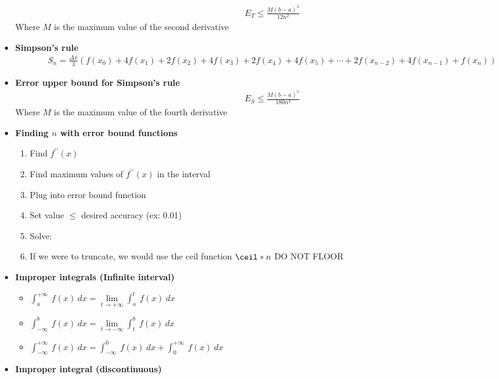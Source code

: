 \documentclass{report}
\begin{document}
\begin{itemize}
\begin{align*}
                E_{T} \leq \frac{M(b-a)^3}{12n^2}
            \end{align*}
            Where $M$ is the maximum value of the second derivative
        \item \textbf{Simpson’s rule}
            \begin{align*}
                S_n = \frac{\Delta x}{3} \left( f(x_0) + 4f(x_1) + 2f(x_2) + 4f(x_3) + 2f(x_4) + 4f(x_5) + \cdots + 2f(x_{n-2}) + 4f(x_{n-1}) + f(x_n) \right)
            \end{align*}
        \item \textbf{Error upper bound for Simpson’s rule}
            \begin{align*}
                E_{S} \leq \frac{M(b-a)^5}{180n^4}
            \end{align*}
            Where $M$ is the maximum value of the fourth derivative
        \item \textbf{Finding $n$ with error bound functions}
            \begin{enumerate}
                \item Find $f^{\prime\prime}(x)$
                \item Find maximum values of $f^{\prime\prime}(x)$ in the interval
                \item Plug into error bound function 
                \item Set value $\leq$ desired accuracy (ex: 0.01)
                \item Solve: 
                \item If we were to truncate, we would use the ceil function $\ceil*{n}$ DO NOT FLOOR
            \end{enumerate}
        \item \textbf{Improper integrals (Infinite interval)}
            \begin{itemize}
                \item $\int_{a}^{+\infty}\ f(x)\ dx  = \lim\limits_{t \to +\infty}{\int_{a}^{t}\ f(x)\ dx}$  
                \item $\int_{-\infty}^{b}\ f(x)\ dx = \lim\limits_{t \to -\infty}{\int_{t}^{b}\ f(x)\ dx}$ 
                \item $\int_{-\infty}^{+\infty}\ f(x)\ dx = \int_{-\infty}^{0}\ f(x)\ dx + \int_{0}^{+\infty}\ f(x)\ dx$
            \end{itemize}
        \item \textbf{Improper integral (discontinuous)}
            \begin{itemize}

\end{itemize}
\end{itemize}
\end{document}
